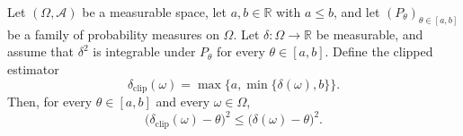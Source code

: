 \begin{theorem}
Let $(\Omega,\mathcal A)$ be a measurable space, let $a,b\in\mathbb R$
with $a\le b$, and let $(P_\theta)_{\theta\in[a,b]}$ be a family of
probability measures on $\Omega$.  Let
$\delta:\Omega\to\mathbb R$ be measurable, and assume that
$\delta^2$ is integrable under $P_\theta$ for every
$\theta\in[a,b]$.  Define the clipped estimator
\[
  \delta_{\mathrm{clip}}(\omega)
  =\max\{a,\min\{\delta(\omega),b\}\}.
\]
Then, for every $\theta\in[a,b]$ and every $\omega\in\Omega$,
\[
  \bigl(\delta_{\mathrm{clip}}(\omega)-\theta\bigr)^2
  \le
  \bigl(\delta(\omega)-\theta\bigr)^2.
\]
\end{theorem}
